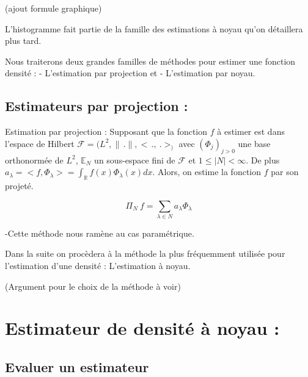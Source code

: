 \documentclass[
]{article}
\begin{document}
(ajout formule graphique)

L'histogramme fait partie de la famille des estimations à noyau qu'on
détaillera plus tard.

Nous traiterons deux grandes familles de méthodes pour estimer une
fonction densité : \newline \hspace*{0.5cm} - L'estimation par
projection et \hspace*{0.5cm} - L'estimation par noyau.

\subsection{Estimateurs par projection :}

\begin{definition}
Estimation par projection : \newline
Supposant que la fonction $f$ à estimer est dans l'espace de Hilbert
$\mathcal F = (L^2 , \parallel\,.\parallel, <\,.,~.>_)$ avec $(\Phi_j)_{j>0}$ une base orthonormée de $L^2$, $\mathbb E _N$  un sous-espace fini de $\mathcal F$ et $1 \leq |N| < \infty$.\newline
De plus $a_{\lambda} = <f,\Phi_{\lambda}> = \int_{\mathbb R}f(x)\Phi_{\lambda}(x) dx$.\newline
Alors, on estime la fonction $f$ par son projeté. 

$$
\Pi_N~f = \sum_{\lambda \in N} a_{\lambda} \Phi_{\lambda}
$$
\end{definition}

\begin{remark}
-Cette méthode nous ramène au cas paramétrique.\newline
\end{remark}

Dans la suite on procèdera à la méthode la plus fréquemment utilisée
pour l'estimation d'une densité : L'estimation à noyau.\newline 

(Argument pour le choix de la méthode à voir)

\section{Estimateur de densité à noyau :}

\subsection{Evaluer un estimateur}
\end{document}

